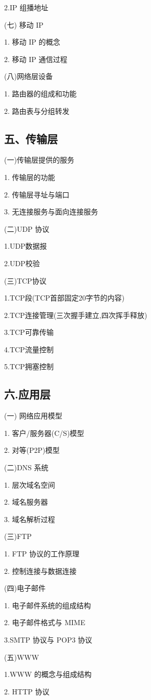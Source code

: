 \documentclass[10pt]{article}
\begin{document}
2.IP 组播地址

(七) {\color{red}移动 IP}

1. 移动 IP 的概念

2. 移动 IP 通信过程

(八)网络层设备

1. 路由器的组成和功能

2. 路由表与分组转发

\subsection*{五、传输层}

(一)传输层提供的服务

1. 传输层的功能

2. {\color{red}传输层寻址与端口}

3. 无连接服务与面向连接服务

(二)UDP 协议

1.UDP数据报

2.{\color{red}UDP校验}

(三)TCP协议

1.TCP段(TCP首部固定20字节的内容)

2.TCP连接管理(三次握手建立,四次挥手释放)

3.TCP可靠传输

4.TCP流量控制

5.TCP拥塞控制

\subsection*{六.应用层}

{\color{red} (一) 网络应用模型

1. 客户/服务器(C/S)模型

2. 对等(P2P)模型

(二)DNS 系统

1. 层次域名空间

2. 域名服务器

3. 域名解析过程

(三)FTP

1. FTP 协议的工作原理

2. 控制连接与数据连接

(四)电子邮件

1. 电子邮件系统的组成结构

2. 电子邮件格式与 MIME

3.SMTP 协议与 POP3 协议

(五)WWW

1.WWW 的概念与组成结构

2. HTTP 协议}
\end{document}
